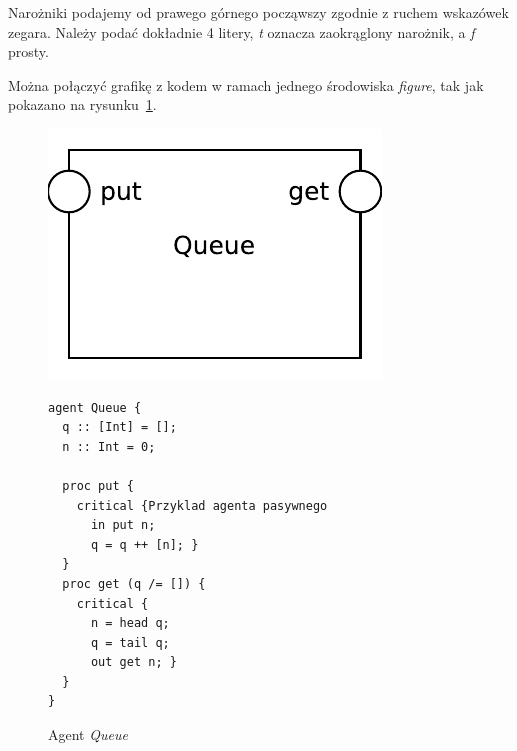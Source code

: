 \documentclass[a4paper,11pt]{article}
\begin{document}
Narożniki podajemy od prawego {\color{blue}górnego począwszy zgodnie z} ruchem wskazówek zegara. Należy podać dokładnie 4 litery, \emph{t} oznacza zaokrąglony narożnik, a \emph{f} prosty.

Można połączyć grafikę z kodem w ramach jednego środowiska \emph{figure}, tak jak pokazano na rysunku~\ref{fig:queue}.

\begin{figure}[!ht]
\centerline{\includegraphics[scale=0.65]{queue}}
\begin{lstlisting}[aboveskip=4mm]
agent Queue {
  q :: [Int] = [];
  n :: Int = 0;

  proc put {
    critical {Przyklad agenta pasywnego
      in put n;
      q = q ++ [n]; } 
  }
  proc get (q /= []) {
    critical {
      n = head q;
      q = tail q;
      out get n; } 
  }
}
\end{lstlisting}
\caption{Agent \emph{Queue}}
\label{fig:queue}
\end{figure}
\end{document}
